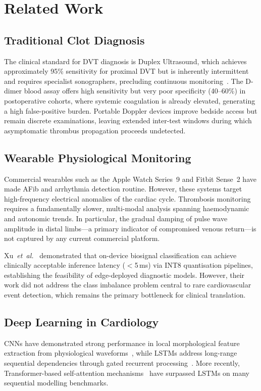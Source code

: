 \documentclass[conference]{IEEEtran}
\begin{document}
\section{Related Work}

\subsection{Traditional Clot Diagnosis}
The clinical standard for DVT diagnosis is Duplex Ultrasound, which
achieves approximately 95\% sensitivity for proximal DVT but is
inherently intermittent and requires specialist sonographers, precluding
continuous monitoring~\cite{b16}.  The D-dimer blood assay offers high
sensitivity but very poor specificity (40--60\%) in postoperative
cohorts, where systemic coagulation is already elevated, generating a
high false-positive burden.  Portable Doppler devices improve bedside
access but remain discrete examinations, leaving extended inter-test
windows during which asymptomatic thrombus propagation proceeds
undetected.

\subsection{Wearable Physiological Monitoring}
Commercial wearables such as the Apple Watch Series~9 and Fitbit
Sense~2 have made AFib and arrhythmia detection routine.  However,
these systems target high-frequency electrical anomalies of the cardiac
cycle.  Thrombosis monitoring requires a fundamentally slower,
multi-modal analysis spanning haemodynamic and autonomic trends.  In
particular, the gradual damping of pulse wave amplitude in distal
limbs---a primary indicator of compromised venous return---is not
captured by any current commercial platform.

Xu~\textit{et~al.}~\cite{b11} demonstrated that on-device biosignal
classification can achieve clinically acceptable inference latency
($<$5\,ms) via INT8 quantisation pipelines, establishing the
feasibility of edge-deployed diagnostic models.  However, their work
did not address the class imbalance problem central to rare
cardiovascular event detection, which remains the primary bottleneck
for clinical translation.

\subsection{Deep Learning in Cardiology}
CNNs have demonstrated strong performance in local morphological
feature extraction from physiological waveforms~\cite{b10}, while
LSTMs address long-range sequential dependencies through gated
recurrent processing~\cite{b5}.  More recently, Transformer-based
self-attention mechanisms~\cite{b1} have surpassed LSTMs on many
sequential modelling benchmarks.
\end{document}
